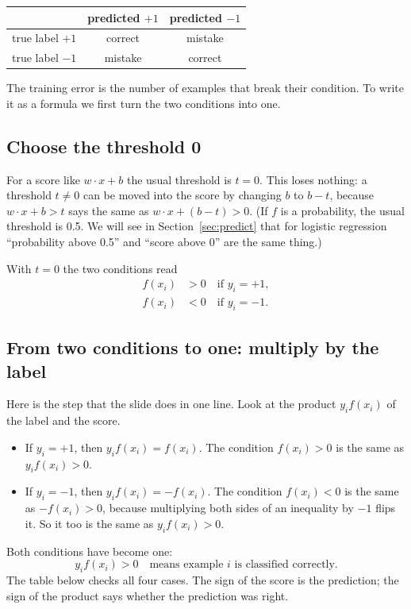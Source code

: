 \documentclass[11pt]{article}
\begin{document}
\begin{center}
\begin{tabular}{lcc}
  \toprule
  & predicted $+1$ & predicted $-1$ \\
  \midrule
  true label $+1$ & correct & mistake \\
  true label $-1$ & mistake & correct \\
  \bottomrule
\end{tabular}
\end{center}

The training error is the number of examples that break their condition. To write it as a formula we
first turn the two conditions into one.

\subsection{Choose the threshold 0}

For a score like $w \cdot x + b$ the usual threshold is $t = 0$. This loses nothing: a threshold
$t \ne 0$ can be moved into the score by changing $b$ to $b - t$, because $w \cdot x + b > t$ says
the same as $w \cdot x + (b - t) > 0$. (If $f$ is a probability, the usual threshold is 0.5. We will
see in Section~\ref{sec:predict} that for logistic regression ``probability above 0.5'' and ``score
above 0'' are the same thing.)

With $t = 0$ the two conditions read
\begin{align*}
  f(x_i) &> 0 \quad \text{if } y_i = +1, \\
  f(x_i) &< 0 \quad \text{if } y_i = -1.
\end{align*}

\subsection{From two conditions to one: multiply by the label}

Here is the step that the slide does in one line. Look at the product $y_i f(x_i)$ of the label and
the score.
\begin{itemize}
  \item If $y_i = +1$, then $y_i f(x_i) = f(x_i)$. The condition $f(x_i) > 0$ is the same as
        $y_i f(x_i) > 0$.
  \item If $y_i = -1$, then $y_i f(x_i) = -f(x_i)$. The condition $f(x_i) < 0$ is the same as
        $-f(x_i) > 0$, because multiplying both sides of an inequality by $-1$ flips it. So it too is
        the same as $y_i f(x_i) > 0$.
\end{itemize}
Both conditions have become one:
\[
  \boxed{\;y_i f(x_i) > 0 \quad\text{means example } i \text{ is classified correctly.}\;}
\]
The table below checks all four cases. The sign of the score is the prediction; the sign of the
product says whether the prediction was right.
\end{document}
